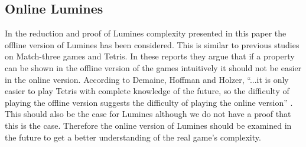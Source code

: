 \subsection{Online Lumines}

In the reduction and proof of Lumines complexity presented in this paper the offline version of Lumines has been considered. This is similar to previous studies on Match-three games and Tetris. In these reports they argue that if a property can be shown in the offline version of the games intuitively it should not be easier in the online version. According to Demaine, Hoffman and Holzer, ``...it is only easier to play Tetris with complete knowledge of the future, so the difficulty of playing the offline version suggests the difficulty of playing the online version'' \cite[p. 2]{tetris}. This should also be the case for Lumines although we do not have a proof that this is the case. Therefore the online version of Lumines should be examined in the future to get a better understanding of the real game's complexity.

